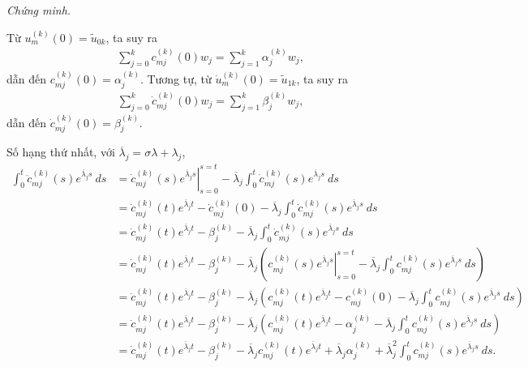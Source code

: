 \documentclass[12pt,a4paper]{article}
\theoremstyle{definition}
\begin{document}
\textit{Chứng minh.}

Từ $u_m^{(k)}(0) = \tilde{u}_{0k}$, ta suy ra
\begin{align*}
    \sum_{j=0}^k c_{mj}^{(k)}(0) w_j = \sum_{j=1}^k \alpha_j^{(k)} w_j,
\end{align*}
dẫn đến $c_{mj}^{(k)}(0) = \alpha_j^{(k)}$. Tương tự, từ $\dot{u}_m^{(k)}(0) = \tilde{u}_{1k}$, ta suy ra
\begin{align*}
    \sum_{j=0}^k \dot{c}_{mj}^{(k)}(0) w_j = \sum_{j=1}^k \beta_j^{(k)} w_j,
\end{align*}
dẫn đến $\dot{c}_{mj}^{(k)}(0) = \beta_j^{(k)}$.

Số hạng thứ nhất, với $\overline{\lambda}_j = \sigma \lambda + \lambda_j$,
\begin{align*}
    \int_0^t \ddot{c}_{mj}^{(k)}(s) e^{\overline{\lambda}_j s}\:ds
    &= \left.\dot{c}_{mj}^{(k)}(s) e^{\overline{\lambda}_j s}\right|_{s=0}^{s=t} - \overline{\lambda}_j \int_0^t \dot{c}_{mj}^{(k)}(s) e^{\overline{\lambda}_j s}\:ds \\
    &= \dot{c}_{mj}^{(k)}(t) e^{\overline{\lambda}_j t} - \dot{c}_{mj}^{(k)}(0) - \overline{\lambda}_j \int_0^t \dot{c}_{mj}^{(k)}(s) e^{\overline{\lambda}_j s}\:ds \\
    &= \dot{c}_{mj}^{(k)}(t) e^{\overline{\lambda}_j t} - \beta_j^{(k)} - \overline{\lambda}_j \int_0^t \dot{c}_{mj}^{(k)}(s) e^{\overline{\lambda}_j s}\:ds \\
    &= \dot{c}_{mj}^{(k)}(t) e^{\overline{\lambda}_j t} - \beta_j^{(k)} - \overline{\lambda}_j \left(\left.c_{mj}^{(k)}(s) e^{\overline{\lambda}_j s}\right|_{s=0}^{s=t} - \overline{\lambda}_j \int_0^t c_{mj}^{(k)}(s) e^{\overline{\lambda}_j s}\:ds\right) \\
    &= \dot{c}_{mj}^{(k)}(t) e^{\overline{\lambda}_j t} - \beta_j^{(k)} - \overline{\lambda}_j \left(c_{mj}^{(k)}(t) e^{\overline{\lambda}_j t} - c_{mj}^{(k)}(0)  - \overline{\lambda}_j \int_0^t c_{mj}^{(k)}(s) e^{\overline{\lambda}_j s}\:ds\right) \\
    &= \dot{c}_{mj}^{(k)}(t) e^{\overline{\lambda}_j t} - \beta_j^{(k)} - \overline{\lambda}_j \left(c_{mj}^{(k)}(t) e^{\overline{\lambda}_j t} - \alpha_j^{(k)}  - \overline{\lambda}_j \int_0^t c_{mj}^{(k)}(s) e^{\overline{\lambda}_j s}\:ds\right) \\
    &= \dot{c}_{mj}^{(k)}(t) e^{\overline{\lambda}_j t} - \beta_j^{(k)} - \overline{\lambda}_j c_{mj}^{(k)}(t) e^{\overline{\lambda}_j t} + \overline{\lambda}_j \alpha_j^{(k)}  + \overline{\lambda}^2_j \int_0^t c_{mj}^{(k)}(s) e^{\overline{\lambda}_j s}\:ds.
\end{align*}
\end{document}
